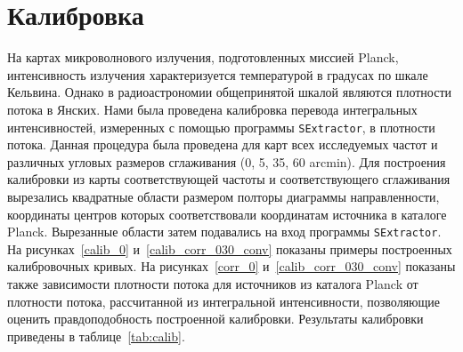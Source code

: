 \documentclass[12pt,a4paper]{extarticle}
\begin{document}
\section{Калибровка}
На картах микроволнового излучения, подготовленных миссией Planck, интенсивность излучения характеризуется температурой в градусах по шкале Кельвина. Однако в радиоастрономии общепринятой шкалой являются плотности потока в Янских. Нами была проведена калибровка перевода интегральных интенсивностей, измеренных с помощью программы \texttt{SExtractor}, в плотности потока. Данная процедура была проведена для карт всех исследуемых частот и различных угловых размеров сглаживания (0, 5, 35, 60 arcmin). Для построения калибровки из карты соответствующей частоты и соответствующего сглаживания вырезались квадратные области размером полторы диаграммы направленности, координаты центров которых соответствовали координатам источника в каталоге Planck. Вырезанные области затем подавались на вход программы \texttt{SExtractor}. На рисунках~\ref{calib_0} и~\ref{calib_corr_030_conv} показаны примеры построенных калибровочных кривых. На рисунках~\ref{corr_0} и~\ref{calib_corr_030_conv} показаны также зависимости плотности потока для источников из каталога Planck от плотности потока, рассчитанной из интегральной интенсивности, позволяющие оценить правдоподобность построенной калибровки. Результаты калибровки приведены в таблице~\ref{tab:calib}.
\end{document}
